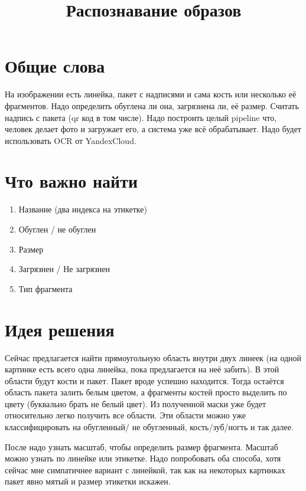 \documentclass[a4paper]{article}
\title{Распознавание образов}
\date{}
\begin{document}
\maketitle

\section{Общие слова}

На изображении есть линейка, пакет с надписями и сама кость или несколько её фрагментов. Надо определить обуглена ли она, загрязнена ли, её размер. Считать надпись с пакета (qr код в том числе). Надо построить целый pipeline что, человек делает фото и загружает его, а система уже всё обрабатывает. Надо будет использовать OCR от YandexCloud.

\section{Что важно найти}

\begin{enumerate}
	\item Название (два индекса на этикетке)
	\item Обуглен / не обуглен
	\item Размер
	\item Загрязнен / Не загрязнен
	\item Тип фрагмента
\end{enumerate}



\section{Идея решения}

Сейчас предлагается найти прямоугольную область внутри двух линеек (на одной картинке есть всего одна линейка, пока предлагается на неё забить).  В этой области будут кости и пакет. Пакет вроде успешно находится. Тогда остаётся область пакета залить белым цветом, а фрагменты костей просто выделить по цвету (буквально брать не белый цвет). Из полученной маски уже будет относительно легко получить все области. Эти области можно уже классифицировать на обугленный/ не обугленный, кость/зуб/ногть и так далее.

После надо узнать масштаб, чтобы определить размер фрагмента. Масштаб можно узнать по линейке или этикетке. Надо попробовать оба способа, хотя сейчас мне симпатичнее вариант с линейкой, так как на некоторых картинках пакет явно мятый и размер этикетки искажен.
\end{document}
